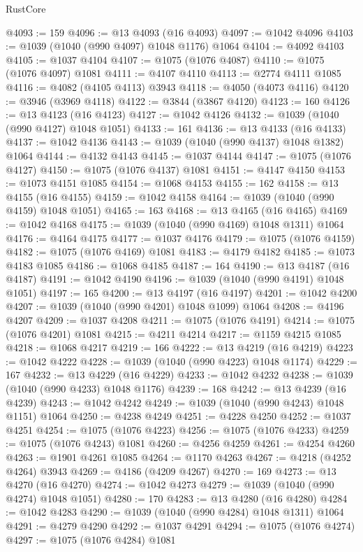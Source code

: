 \begin{lexlean}{RustCore}
\begin{coremodule}
@4093 := 159
@4096 := @13 @4093 (@16 @4093)
@4097 := @1042 @4096
@4103 := @1039 (@1040 (@990 @4097) @1048 @1176) @1064
@4104 := @4092 @4103
@4105 := @1037 @4104
@4107 := @1075 (@1076 @4087)
@4110 := @1075 (@1076 @4097) @1081
@4111 := @4107 @4110
@4113 := @2774 @4111 @1085
@4116 := @4082 (@4105 @4113) @3943
@4118 := @4050 (@4073 @4116)
@4120 := @3946 (@3969 @4118)
@4122 := @3844 (@3867 @4120)
@4123 := 160
@4126 := @13 @4123 (@16 @4123)
@4127 := @1042 @4126
@4132 := @1039 (@1040 (@990 @4127) @1048 @1051)
@4133 := 161
@4136 := @13 @4133 (@16 @4133)
@4137 := @1042 @4136
@4143 := @1039 (@1040 (@990 @4137) @1048 @1382) @1064
@4144 := @4132 @4143
@4145 := @1037 @4144
@4147 := @1075 (@1076 @4127)
@4150 := @1075 (@1076 @4137) @1081
@4151 := @4147 @4150
@4153 := @1073 @4151 @1085
@4154 := @1068 @4153
@4155 := 162
@4158 := @13 @4155 (@16 @4155)
@4159 := @1042 @4158
@4164 := @1039 (@1040 (@990 @4159) @1048 @1051)
@4165 := 163
@4168 := @13 @4165 (@16 @4165)
@4169 := @1042 @4168
@4175 := @1039 (@1040 (@990 @4169) @1048 @1311) @1064
@4176 := @4164 @4175
@4177 := @1037 @4176
@4179 := @1075 (@1076 @4159)
@4182 := @1075 (@1076 @4169) @1081
@4183 := @4179 @4182
@4185 := @1073 @4183 @1085
@4186 := @1068 @4185
@4187 := 164
@4190 := @13 @4187 (@16 @4187)
@4191 := @1042 @4190
@4196 := @1039 (@1040 (@990 @4191) @1048 @1051)
@4197 := 165
@4200 := @13 @4197 (@16 @4197)
@4201 := @1042 @4200
@4207 := @1039 (@1040 (@990 @4201) @1048 @1099) @1064
@4208 := @4196 @4207
@4209 := @1037 @4208
@4211 := @1075 (@1076 @4191)
@4214 := @1075 (@1076 @4201) @1081
@4215 := @4211 @4214
@4217 := @1159 @4215 @1085
@4218 := @1068 @4217
@4219 := 166
@4222 := @13 @4219 (@16 @4219)
@4223 := @1042 @4222
@4228 := @1039 (@1040 (@990 @4223) @1048 @1174)
@4229 := 167
@4232 := @13 @4229 (@16 @4229)
@4233 := @1042 @4232
@4238 := @1039 (@1040 (@990 @4233) @1048 @1176)
@4239 := 168
@4242 := @13 @4239 (@16 @4239)
@4243 := @1042 @4242
@4249 := @1039 (@1040 (@990 @4243) @1048 @1151) @1064
@4250 := @4238 @4249
@4251 := @4228 @4250
@4252 := @1037 @4251
@4254 := @1075 (@1076 @4223)
@4256 := @1075 (@1076 @4233)
@4259 := @1075 (@1076 @4243) @1081
@4260 := @4256 @4259
@4261 := @4254 @4260
@4263 := @1901 @4261 @1085
@4264 := @1170 @4263
@4267 := @4218 (@4252 @4264) @3943
@4269 := @4186 (@4209 @4267)
@4270 := 169
@4273 := @13 @4270 (@16 @4270)
@4274 := @1042 @4273
@4279 := @1039 (@1040 (@990 @4274) @1048 @1051)
@4280 := 170
@4283 := @13 @4280 (@16 @4280)
@4284 := @1042 @4283
@4290 := @1039 (@1040 (@990 @4284) @1048 @1311) @1064
@4291 := @4279 @4290
@4292 := @1037 @4291
@4294 := @1075 (@1076 @4274)
@4297 := @1075 (@1076 @4284) @1081

\end{coremodule}
\end{lexlean}
